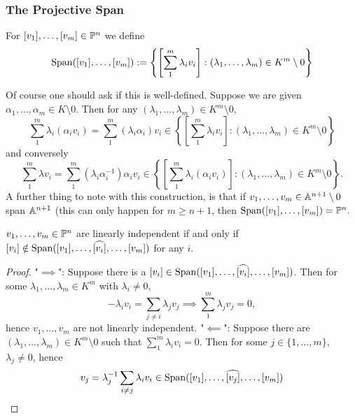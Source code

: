    \subsubsection{The Projective Span}
        \begin{definition}
            For $[v_1],\dots,[v_m]\in\mathbb{P}^n$ we define 
            $$\mathrm{Span}([v_1],\dots,[v_m]):=\left\{\left[\sum_1^m \lambda_iv_i\right] : (\lambda_1,\dots,\lambda_m)\in K^m\setminus 0 \right\}$$
        \end{definition}
        \begin{remark}
            Of course one should ask if this is well-defined. Suppose we are given $\alpha_1,\dots,\alpha_m\in K\setminus 0$. Then for any $(\lambda_1,\dots,\lambda_m)\in K^m\setminus 0$,
            $$\sum_1^m \lambda_i(\alpha_i v_i) = \sum_1^m (\lambda_i\alpha_i)v_i\in \left\{\left[\sum_1^m \lambda_iv_i\right] : (\lambda_1,\dots,\lambda_m)\in K^m\setminus 0 \right\} $$
            and conversely 
            $$\sum_1^m \lambda v_i = \sum_1^m (\lambda_i\alpha_i^{-1})\alpha_iv_i \in \left\{\left[\sum_1^m \lambda_i(\alpha_iv_i)\right] : (\lambda_1,\dots,\lambda_m)\in K^m\setminus 0 \right\}.$$
            A further thing to note with this construction, is that if $v_1,\dots,v_m\in \mathbb{A}^{n+1}\setminus 0$ span $\mathbb{A}^{n+1}$ (this can only happen for $m\geq n+1$, then $\mathrm{Span}([v_1],\dots,[v_m])=\mathbb{P}^n.$
        \end{remark}
        \begin{lemma}\label{EquivalentDefinitionOfLinearlyIndependent}
            $v_1,\dots,v_m\in \mathbb{P}^n$ are linearly independent if and only if $[v_i]\notin \mathrm{Span}([v_1],\dots,\widehat{[v_i]},\dots,[v_m])$ for any $i$.
        \end{lemma}
        \begin{proof}
            "$\implies$": Suppose there is a $[v_i]\in \mathrm{Span}([v_1],\dots,\widehat{[v_i]},\dots,[v_m])$. Then for some $\lambda_1,\dots,\lambda_m\in K^m$ with $\lambda_i \neq 0$,
            $$-\lambda_i v_i = \sum_{j\neq i} \lambda_jv_j \implies \sum_1^m \lambda_jv_j = 0,$$
            hence $v_1,\dots,v_m$ are not linearly independent. 
            "$\impliedby$": Suppose there are $(\lambda_1,\dots,\lambda_m)\in K^m\setminus 0$ such that $\sum_1^m \lambda_i v_i = 0$. Then for some $j\in\{1,\dots,m\}$, $\lambda_j\neq 0$, hence 
            $$v_j = \lambda_j^{-1}\sum_{i\neq j} \lambda_i v_i \in \mathrm{Span}([v_1],\dots,\widehat{[v_j]},\dots, [v_m])$$
        \end{proof}
